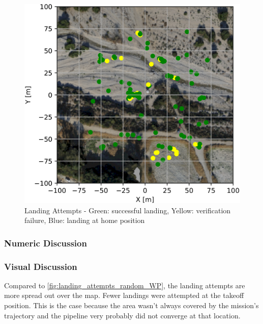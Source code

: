     \begin{figure}[h]
        \begin{center}
            \includegraphics[scale=0.25]{images/evaluation/landings_complete_randomized_GT.png}
            \caption{Landing Attempts - Green: successful landing, Yellow: verification failure, Blue: landing at home position}
            \label{fig:landing_attempts_complete_rand}
        \end{center}
    \end{figure}%

    \subsubsection{Numeric Discussion}



    \subsubsection{Visual Discussion}
    Compared to \cref{fig:landing_attempts_random_WP}, the landing attempts are more spread out over the map. Fewer landings were attempted at the takeoff position. This is the case because the area wasn't always covered by the mission's trajectory and the pipeline very probably did not converge at that location.

